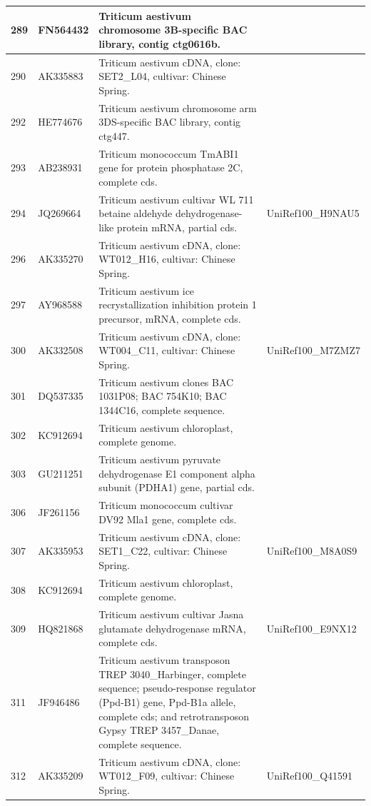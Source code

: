 \documentclass[10.9pt]{article} %
\begin{document}
{\begin{longtable}{|p{1.5cm}|p{2cm}|p{9cm}|p{3cm}|}
\hline
289 & FN564432 & Triticum aestivum chromosome 3B-specific BAC library, contig ctg0616b. & \\
\hline
290 & AK335883 & Triticum aestivum cDNA, clone: SET2\_L04, cultivar: Chinese Spring. & \\
\hline
292 & HE774676 & Triticum aestivum chromosome arm 3DS-specific BAC library, contig ctg447. & \\
\hline
293 & AB238931 & Triticum monococcum TmABI1 gene for protein phosphatase 2C, complete cds. & \\
\hline
294 & JQ269664 & Triticum aestivum cultivar WL 711 betaine aldehyde dehydrogenase-like protein mRNA, partial cds. & UniRef100\_H9NAU5\\
\hline
296 & AK335270 & Triticum aestivum cDNA, clone: WT012\_H16, cultivar: Chinese Spring. & \\
\hline
297 & AY968588 & Triticum aestivum ice recrystallization inhibition protein 1 precursor, mRNA, complete cds. & \\
\hline
300 & AK332508 & Triticum aestivum cDNA, clone: WT004\_C11, cultivar: Chinese Spring. & UniRef100\_M7ZMZ7\\
\hline
301 & DQ537335 & Triticum aestivum clones BAC 1031P08; BAC 754K10; BAC 1344C16, complete sequence. & \\
\hline
302 & KC912694 & Triticum aestivum chloroplast, complete genome. & \\
\hline
303 & GU211251 & Triticum aestivum pyruvate dehydrogenase E1 component alpha subunit (PDHA1) gene, partial cds. & \\
\hline
306 & JF261156 & Triticum monococcum cultivar DV92 Mla1 gene, complete cds. & \\
\hline
307 & AK335953 & Triticum aestivum cDNA, clone: SET1\_C22, cultivar: Chinese Spring. & UniRef100\_M8A0S9\\
\hline
308 & KC912694 & Triticum aestivum chloroplast, complete genome. & \\
\hline
309 & HQ821868 & Triticum aestivum cultivar Jasna glutamate dehydrogenase mRNA, complete cds. & UniRef100\_E9NX12\\
\hline
311 & JF946486 & Triticum aestivum transposon TREP 3040\_Harbinger, complete sequence; pseudo-response regulator (Ppd-B1) gene, Ppd-B1a allele, complete cds; and retrotransposon Gypsy TREP 3457\_Danae, complete sequence. & \\
\hline
312 & AK335209 & Triticum aestivum cDNA, clone: WT012\_F09, cultivar: Chinese Spring. & UniRef100\_Q41591\\

\end{longtable}}
\end{document}
